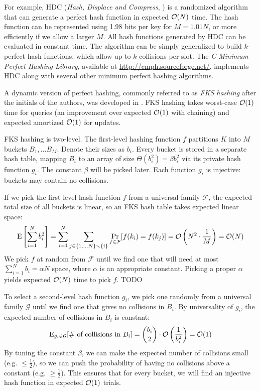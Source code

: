 For example, HDC (\textit{Hash, Displace and Compress},
\cite{hdc-hashing}) is a randomized algorithm that can generate a perfect
hash function in expected $\mathcal{O}(N)$ time. The hash function can be represented
using 1.98 bits per key for $M=1.01 N$, or more efficiently if we allow a larger
$M$. All hash functions generated by HDC can be evaluated in constant time.
The algorithm can be simply generalized to build $k$-perfect hash functions,
which allow up to $k$ collisions per slot. The \textit{C Minimum Perfect
Hashing Library}, available at \url{http://cmph.sourceforge.net/}, implements
HDC along with several other minimum perfect hashing algorithms.

A dynamic version of perfect hashing, commonly referred to as \emph{FKS
hashing} after the initials of the authors, was developed in \cite{fks-hashing}.
FKS hashing takes worst-case $\mathcal{O}(1)$ time for queries (an improvement over
expected $\mathcal{O}(1)$ with chaining) and expected amortized $\mathcal{O}(1)$ for updates.

FKS hashing is two-level. The first-level hashing function $f$ partitions
$K$ into $M$ buckets $B_1,\ldots B_M$. Denote their sizes as $b_i$.
Every bucket is stored in a separate hash table, mapping $B_i$ to an array
of size $\Theta(b_i^2)=\beta b_i^2$ via its private hash function $g_i$.
The constant $\beta$ will be picked later.
Each function $g_i$ is injective: buckets may contain no collisions.

If we pick the first-level hash function $f$ from a universal family
$\mathcal{F}$, the expected total size of all buckets is linear, so an FKS
hash table takes expected linear space:
$$\mathrm{E}\left[\sum_{i=1}^N b_i^2\right]=
	\sum_{i=1}^N \sum_{j\in\{1,\ldots N\}\smallsetminus\{i\}}
	\Pr_{f\in\mathcal{F}}[f(k_i)=f(k_j)]=
	\mathcal{O}\left(N^2\cdot\frac{1}{M}\right)=\mathcal{O}(N)$$
We pick $f$ at random from $\mathcal{F}$ until we find one that will need at
most $\sum_{i=1}^N b_i=\alpha N$ space, where $\alpha$ is an appropriate
constant. Picking a proper $\alpha$ yields expected $\mathcal{O}(N)$ time to pick $f$.
TODO

To select a second-level hash function $g_i$, we pick one randomly from
a universal family $\mathcal{G}$ until we find one that gives no collisions
in $B_i$. By universality of $g_i$, the expected number of collisions in $B_i$
is constant:
$$\mathrm{E}_{g_i\in\mathcal{G}}[\text{\# of collisions in }B_i]=
	{b_i\choose 2}\cdot\mathcal{O}\left(\frac{1}{b_i^2}\right)=\mathcal{O}(1)$$
By tuning the constant $\beta$, we can make the expected number of collisions
small (e.g. $\leq\frac{1}{2}$), so we can push the probability of having no
collisions above a constant (e.g. $\geq\frac{1}{2}$). This ensures that for
every bucket, we will find an injective hash function in expected $\mathcal{O}(1)$
trials.

